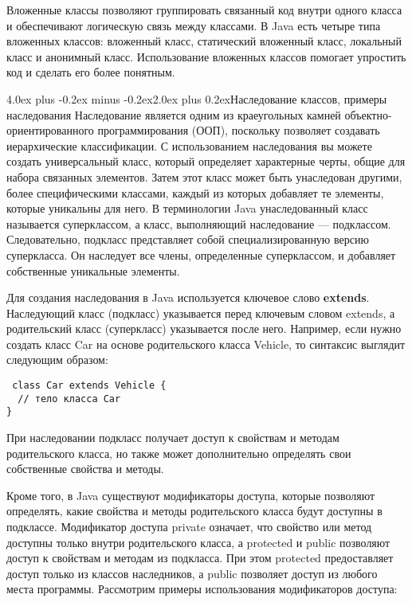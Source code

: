 \documentclass[12pt, a4paper]{book}%
\makeatletter
\renewcommand{\section}{\@startsection{section}{1}{1pt}%
{4.0ex plus -0.2ex minus -0.2ex}{2.0ex plus 0.2ex}{\centering\bf}}%
\makeatother
\begin{document}
{\begin{enumerate}
Вложенные классы позволяют группировать связанный код внутри одного класса и обеспечивают логическую связь между классами. В Java есть четыре типа вложенных классов: вложенный класс, статический вложенный класс, локальный класс и анонимный класс. Использование вложенных классов помогает упростить код и сделать его более понятным.


\end{enumerate}

\section{Наследование классов, примеры наследования}
Наследование является одним из краеугольных камней объектно-ориентированного программирования (ООП), поскольку позволяет создавать иерархические классификации. С использованием наследования вы можете создать универсальный класс, который определяет характерные черты, общие для набора связанных элементов. Затем этот класс может быть унаследован другими, более специфическими классами, каждый из которых добавляет те элементы, которые уникальны для него. В терминологии Java унаследованный класс называется суперклассом, а класс, выполняющий наследование — подклассом. Следовательно, подкласс представляет собой специализированную версию суперкласса. Он наследует все члены, определенные суперклассом, и добавляет собственные уникальные элементы.

Для создания наследования в Java используется ключевое слово {\bf extends}. Наследующий класс (подкласс) указывается перед ключевым словом extends, а родительский класс (суперкласс) указывается после него. Например, если нужно создать класс Car на основе родительского класса Vehicle, то синтаксис выглядит следующим образом:

\begin{lstlisting}
 class Car extends Vehicle {
  // тело класса Car
}
\end{lstlisting}

При наследовании подкласс получает доступ к свойствам и методам родительского класса, но также может дополнительно определять свои собственные свойства и методы.

Кроме того, в Java существуют модификаторы доступа, которые позволяют определять, какие свойства и методы родительского класса будут доступны в подклассе. Модификатор доступа private означает, что свойство или метод доступны только внутри родительского класса, а protected и public позволяют доступ к свойствам и методам из подкласса. При этом protected предоставляет доступ только из классов наследников, а public позволяет доступ из любого места программы.
Рассмотрим примеры использования модификаторов доступа:

}
\end{document}
